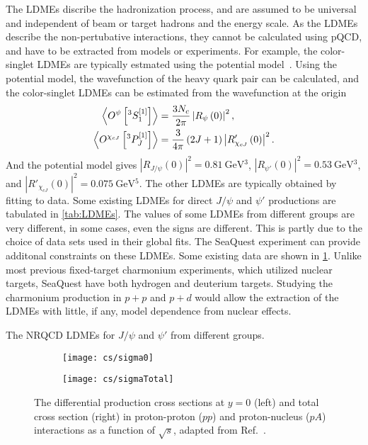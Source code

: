 \documentclass[../main.tex]{subfiles}
\begin{document}
The LDMEs discribe the hadronization process,
and are assumed to be universal and independent of beam or target hadrons and the energy scale.
As the LDMEs describe the non-pertubative interactions,
they cannot be calculated using pQCD, and have to be extracted from models or experiments.
For example, the color-singlet LDMEs are typically estmated using the potential model~\cite{eichten1995}.
Using the potential model, the wavefunction of the heavy quark pair can be calculated, 
and the color-singlet LDMEs can be estimated from the wavefunction at the origin
\begin{equation}
	\begin{split}
		\expval{O^{\psi}\left[^3S_1^{\left[1\right]}\right]} &= \frac{3N_c}{2\pi} \left| R_{\psi}\left(0\right)\right|^2,\\
		\expval{O^{\chi_{cJ}}\left[^3P_J^{\left[1\right]}\right]} &= \frac{3}{4\pi}\left(2J+1\right) \left| R'_{\chi_{cJ}}\left(0\right)\right|^2.
	\end{split}
\end{equation}
And the potential model gives $\left|R_{J/\psi}\left(0\right)\right|^2=\SI{0.81}{\GeV^3}$,
$\left|R_{\psi'}\left(0\right)\right|^2=\SI{0.53}{\GeV^3}$, and $\left|R'_{\chi_{cJ}}\left(0\right)\right|^2=\SI{0.075}{\GeV^5}$.
The other LDMEs are typically obtained by fitting to data.
Some existing LDMEs for direct $J/\psi$ and $\psi'$ productions are tabulated in \cref{tab:LDMEs}.
The values of some LDMEs from different groups are very different, in some cases, even the signs are different.
This is partly due to the choice of data sets used in their global fits. The
SeaQuest experiment can provide additonal constraints on these LDMEs. Some
existing data are shown in \cref{fig:charm_cs}.
Unlike most previous fixed-target charmonium experiments, which utilized nuclear
targets, SeaQuest have both hydrogen and deuterium targets.
Studying the charmonium production in $p+p$ and $p+d$ would allow the extraction
of the LDMEs with little, if any, model dependence from nuclear effects.

\begin{table}[ht!]
	\centering
	\caption{The NRQCD LDMEs for $J/\psi$ and $\psi'$ from different groups.}
	\label{tab:LDMEs}
	\begin{adjustbox}{width=1.03\textwidth, center=\textwidth}
		
	\end{adjustbox}
\end{table}

\begin{figure}[ht!]
	\centering
	\begin{subfigure}{0.48\linewidth}
		\texttt{[image: cs/sigma0]}
	\end{subfigure}
	\begin{subfigure}{0.48\linewidth}
		\texttt{[image: cs/sigmaTotal]}
	\end{subfigure}
	\caption{The differential production cross sections at $y=0$ (left) and total
		cross section (right) in proton-proton ($pp$) and proton-nucleus ($pA$) interactions
		as a function of $\sqrt{s}$, adapted from Ref.~\cite{maltoni2006}.}
	\label{fig:charm_cs}
\end{figure}
\end{document}
